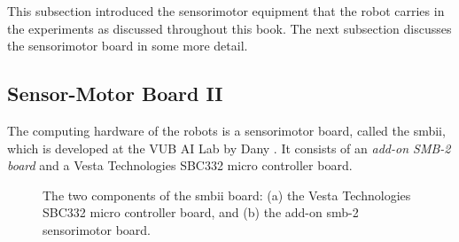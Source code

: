 \bigskip\noindent
This subsection introduced the sensorimotor equipment that the robot carries in the experiments as discussed throughout this book. The next subsection discusses the sensorimotor board in some more detail.

\subsection{Sensor-Motor Board II}\label{setup:smbii}


The computing hardware of the robots is a sensorimotor board, called the {\sc smbii}, which is developed at the VUB AI Lab by Dany \citet{vereertbrugghen:1996}. It consists of an {\em add-on SMB-2 board} and a Vesta Technologies SBC332 micro controller board.

\begin{figure}
\centering
{}
\caption{The two components of the {\sc smbii} board: (a) the Vesta Technologies SBC332 micro controller board, and (b) the add-on {\sc smb}-2 sensorimotor board.}
\end{figure}

